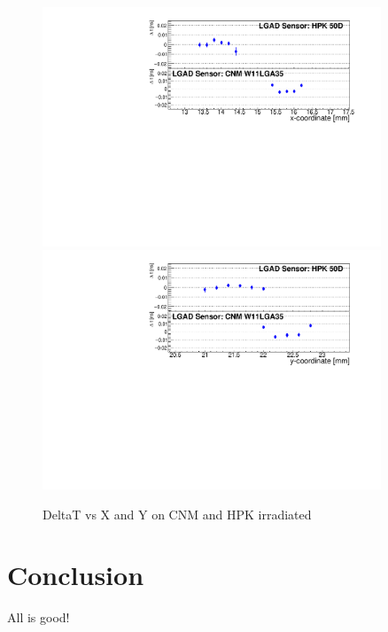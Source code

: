 \documentclass[preprint,1p]{elsarticle}
\begin{document}
\begin{figure}[htbp] 
\centering
\includegraphics[width=0.9\textwidth]{figs/USCSBoard_HPK50DIrradiated-CNMW11LGA35_Run936-961/IrradiatedSensorStudy_MeanTime_vs_X.pdf} 
\includegraphics[width=0.9\textwidth]{figs/USCSBoard_HPK50DIrradiated-CNMW11LGA35_Run936-961/IrradiatedSensorStudy_MeanTime_vs_Y.pdf} 
\caption{DeltaT vs X and Y on CNM and HPK irradiated} 
\label{fig:Sensors} 
\end{figure} 
 




\section{Conclusion}
\label{sec:conclusion} 

All is good!

\end{document}
